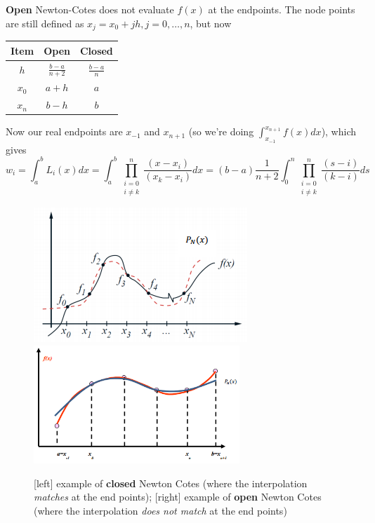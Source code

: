 \documentclass[12pt, answers]{exam}
\begin{document}
\ifprintanswers
\textbf{Open} Newton-Cotes does not evaluate $f(x)$ at the endpoints. The node points are still defined as $x_{j} = x_0 + jh, j = 0, \dots, n$,  but now 
\vspace*{-1em}
\else
\vspace*{2em}
\fi
\begin{center}
\begin{tabular}{c c c}
Item & Open & Closed \\ \hline
$h$  & $\frac{b-a}{n+2}$ & $\frac{b-a}{n}$ \\
$x_0$ & $a+h$ & $a$ \\
$x_n$ & $b-h$ & $b$ \\
\end{tabular}
\end{center}
%
Now our real endpoints are $x_{-1}$ and $x_{n+1}$ (so we're doing $\int_{x_{-1}}^{x_{n+1}} f(x)dx$), which gives
\[
 w_i =  \int_a^b L_i(x)dx = \int_a^b \prod_{\substack{i=0\\ i \neq k}}^n \frac{(x-x_i)}{(x_k-x_i)}dx =  (b-a)\frac{1}{n+2}\int_0^n \prod_{\substack{i=0\\ i \neq k}}^n \frac{(s-i)}{(k-i)}ds
 \]

\begin{figure}
\begin{center}
  \includegraphics[height=2in,clip]{ClosedNewtonCotes}
  \includegraphics[height=1.75in,clip]{OpenNewtonCotes}
\end{center}
\caption{[left] example of \textbf{closed} Newton Cotes (where the interpolation \textit{matches} at the end points); [right] example of \textbf{open} Newton Cotes (where the interpolation \textit{does not match} at the end points)}
\end{figure}
\end{document}
